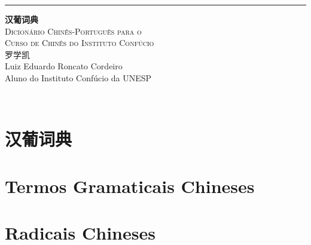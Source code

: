 \documentclass[a4paper,10pt,twoside,openany]{memoir}
\begin{document}
\begin{titlingpage}
  \raggedleft
  \rule{1pt}{\textheight}
  \hspace{0.05\textwidth}
  \parbox[b]{0.75\textwidth}{
    {\Huge\bfseries 汉葡词典}\\[2\baselineskip] %
    {\large\textsc{Dicionário Chinês-Português para o\\%
                   Curso de Chinês do Instituto Confúcio}}\\%
    [4\baselineskip]
    {\Large\textsc{罗学凯}\\%
      \tiny Luiz Eduardo Roncato Cordeiro\\%
            Aluno do Instituto Confúcio da UNESP}

      \vspace{0.5\textheight}

      {\noindent \zhtoday}\\[\baselineskip]
    }
\end{titlingpage}

\newpage
\tableofcontents

\newpage
\chapter{汉葡词典}

%
%
%

\newpage
\begin{multicols}{2}























\end{multicols}

\newpage
\pagestyle{empty}
\chapter{Termos Gramaticais Chineses}


\newpage
\chapter{Radicais Chineses}


\printindex[stroke]
\printindex[radical]
\printindex[pinyin]
\end{document}
